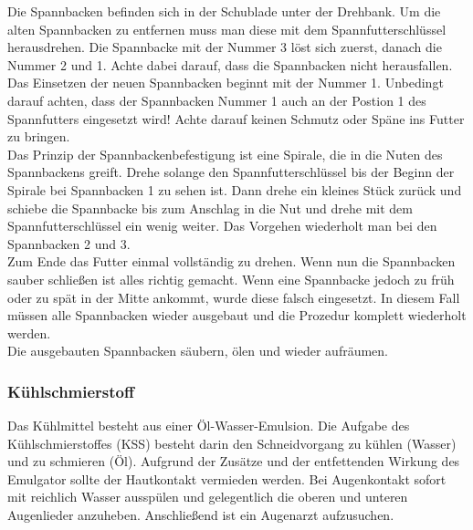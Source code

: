 \documentclass{\basedir/fablab-document}
\begin{document}
Die Spannbacken befinden sich in der Schublade unter der Drehbank. Um die alten Spannbacken zu entfernen muss man diese mit dem Spannfutterschlüssel herausdrehen. Die Spannbacke mit der Nummer 3 löst sich zuerst, danach die Nummer 2 und 1. Achte dabei darauf, dass die Spannbacken nicht herausfallen.\\
Das Einsetzen der neuen Spannbacken beginnt mit der Nummer 1. Unbedingt darauf achten, dass der Spannbacken Nummer 1 auch an der Postion 1 des Spannfutters eingesetzt wird! Achte darauf keinen Schmutz oder Späne ins Futter zu bringen.\\
Das Prinzip der Spannbackenbefestigung ist eine Spirale, die in die Nuten des Spannbackens greift. Drehe solange den Spannfutterschlüssel bis der Beginn der Spirale bei Spannbacken 1 zu sehen ist.  Dann drehe ein kleines Stück zurück und schiebe die Spannbacke bis zum Anschlag in die Nut und drehe mit dem Spannfutterschlüssel ein wenig weiter. Das Vorgehen wiederholt man bei den Spannbacken 2 und 3. \\
Zum Ende das Futter einmal vollständig zu drehen. Wenn nun die Spannbacken sauber schließen ist alles richtig gemacht. Wenn eine Spannbacke jedoch zu früh oder zu spät in der Mitte ankommt, wurde diese falsch eingesetzt. In diesem Fall müssen alle Spannbacken wieder ausgebaut und die Prozedur komplett wiederholt werden.\\

Die ausgebauten Spannbacken säubern, ölen und wieder aufräumen.
\subsubsection{Kühlschmierstoff}

Das Kühlmittel besteht aus einer Öl-Wasser-Emulsion. Die Aufgabe des Kühlschmierstoffes (KSS) besteht darin den Schneidvorgang zu kühlen (Wasser) und zu schmieren (Öl).  Aufgrund der Zusätze und der entfettenden Wirkung des Emulgator sollte der Hautkontakt vermieden werden. Bei Augenkontakt sofort mit reichlich Wasser ausspülen und gelegentlich die oberen und unteren Augenlieder anzuheben. Anschließend ist ein Augenarzt aufzusuchen.
\end{document}
